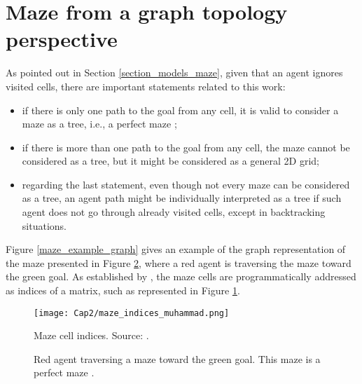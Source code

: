 \section{Maze from a graph topology perspective}
\label{section_models_maze_graph}
As pointed out in Section \ref{section_models_maze}, given that an agent ignores visited cells, there are important statements related to this work:

\begin{itemize}
\item if there is only one path to the goal from any cell, it is valid to consider a maze as a tree, i.e., a perfect maze \cite{Muhammad2021};

\item if there is more than one path to the goal from any cell, the maze cannot be considered as a tree, but it might be considered as a general 2D grid;

\item regarding the last statement, even though not every maze can be considered as a tree, an agent path might be individually interpreted as a tree if such agent does not go through already visited cells, except in backtracking situations.
\end{itemize}

Figure \ref{maze_example_graph} gives an example of the graph representation of the maze presented in Figure \ref{maze_example}, where a red agent is traversing the maze toward the green goal. As established by , the maze cells are programmatically addressed as indices of a matrix, such as represented in Figure \ref{maze_indices_muhammad}.

\begin{figure}[ht!]
\centering
\texttt{[image: Cap2/maze\_indices\_muhammad.png]}
\caption{Maze cell indices. Source: .}
\label{maze_indices_muhammad}
\end{figure}

\begin{figure}
    \centering
    \qquad
    \qquad
    \caption{Red agent traversing a maze toward the green goal. This maze is a perfect maze \cite{Muhammad2021}.}
    \label{maze_example}
\end{figure}

